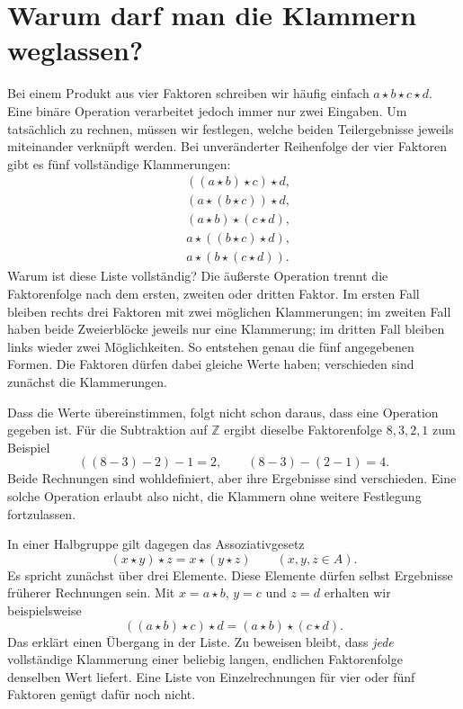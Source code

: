 \section*{Warum darf man die Klammern weglassen?}

Bei einem Produkt aus vier Faktoren schreiben wir häufig einfach
\(a\star b\star c\star d\). Eine binäre Operation verarbeitet jedoch
immer nur zwei Eingaben. Um tatsächlich zu rechnen, müssen wir festlegen,
welche beiden Teilergebnisse jeweils miteinander verknüpft werden.
Bei unveränderter Reihenfolge der vier Faktoren gibt es fünf vollständige
Klammerungen:
\[
  \begin{aligned}
    &((a\star b)\star c)\star d,\\
    &(a\star(b\star c))\star d,\\
    &(a\star b)\star(c\star d),\\
    &a\star((b\star c)\star d),\\
    &a\star(b\star(c\star d)).
  \end{aligned}
\]
Warum ist diese Liste vollständig? Die äußerste Operation trennt die
Faktorenfolge nach dem ersten, zweiten oder dritten Faktor. Im ersten
Fall bleiben rechts drei Faktoren mit zwei möglichen Klammerungen;
im zweiten Fall haben beide Zweierblöcke jeweils nur eine Klammerung;
im dritten Fall bleiben links wieder zwei Möglichkeiten. So entstehen
genau die fünf angegebenen Formen. Die Faktoren dürfen dabei gleiche
Werte haben; verschieden sind zunächst die Klammerungen.

Dass die Werte übereinstimmen, folgt nicht schon daraus, dass eine
Operation gegeben ist. Für die Subtraktion auf \(\mathbb Z\) ergibt
dieselbe Faktorenfolge \(8,3,2,1\) zum Beispiel
\[
  ((8-3)-2)-1=2,
  \qquad
  (8-3)-(2-1)=4.
\]
Beide Rechnungen sind wohldefiniert, aber ihre Ergebnisse sind verschieden.
Eine solche Operation erlaubt also nicht, die Klammern ohne weitere
Festlegung fortzulassen.

In einer Halbgruppe gilt dagegen das Assoziativgesetz
\[
  (x\star y)\star z=x\star(y\star z)
  \qquad(x,y,z\in A).
\]
Es spricht zunächst über drei Elemente. Diese Elemente dürfen selbst
Ergebnisse früherer Rechnungen sein. Mit \(x=a\star b\), \(y=c\)
und \(z=d\) erhalten wir beispielsweise
\[
  ((a\star b)\star c)\star d=(a\star b)\star(c\star d).
\]
Das erklärt einen Übergang in der Liste. Zu beweisen bleibt, dass
\emph{jede} vollständige Klammerung einer beliebig langen, endlichen
Faktorenfolge denselben Wert liefert. Eine Liste von Einzelrechnungen
für vier oder fünf Faktoren genügt dafür noch nicht.

